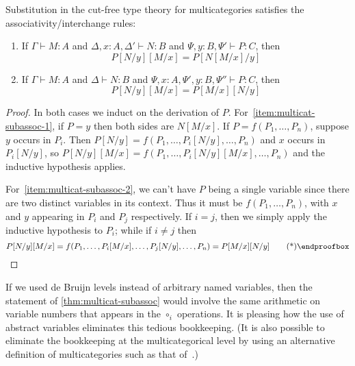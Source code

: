 \documentclass{book}
\let\types\vdash
\begin{document}
\begin{thm}\label{thm:multicat-subassoc}
  Substitution in the cut-free type theory for multicategories satisfies the associativity/interchange rules:
  \begin{enumerate}
  \item If $\Gamma\types M:A$ and $\Delta,x:A,\Delta' \types N:B$ and $\Psi,y:B,\Psi'\types P:C$, then\label{item:multicat-subassoc-1}
    \[ P[N/y][M/x] = P[N[M/x]/y] \]
  \item If $\Gamma\types M:A$ and $\Delta \types N:B$ and $\Psi,x:A,\Psi',y:B,\Psi''\types P:C$, then\label{item:multicat-subassoc-2}
    \[ P[N/y][M/x] = P[M/x][N/y] \]
  \end{enumerate}
\end{thm}
\begin{proof}
  In both cases we induct on the derivation of $P$.
  For~\ref{item:multicat-subassoc-1}, if $P=y$ then both sides are $N[M/x]$.
  If $P=f(P_1,\dots,P_n)$, suppose $y$ occurs in $P_i$.
  Then $P[N/y] = f(P_1,\dots,P_i[N/y],\dots,P_n)$ and $x$ occurs in $P_i[N/y]$, so
  $P[N/y][M/x] = f(P_1,\dots,P_i[N/y][M/x],\dots,P_n)$ and the inductive hypothesis applies.

  For~\ref{item:multicat-subassoc-2}, we can't have $P$ being a single variable since there are two distinct variables in its context.
  Thus it must be $f(P_1,\dots,P_n)$, with $x$ and $y$ appearing in $P_i$ and $P_j$ respectively.
  If $i=j$, then we simply apply the inductive hypothesis to $P_i$; while if $i\neq j$ then
  \begin{equation*}
    P[N/y][M/x] = f(P_1,\dots,P_i[M/x],\dots,P_j[N/y],\dots,P_n) = P[M/x][N/y]\qedhere
  \end{equation*}
\end{proof}

If we used de Bruijn levels instead of arbitrary named variables, then the statement of \cref{thm:multicat-subassoc} would involve the same arithmetic on variable numbers that appears in the $\circ_i$ operations.
It is pleasing how the use of abstract variables eliminates this tedious bookkeeping.
(It is also possible to eliminate the bookkeeping at the multicategorical level by using an alternative definition of multicategories such as that of~\cite[Appendix A]{leinster:higher-opds}.)
\end{document}
